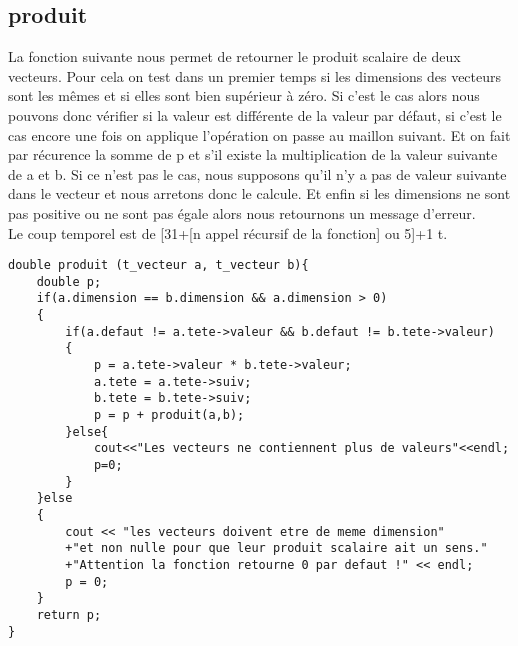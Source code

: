 \documentclass[a4paper,11pt,final]{article}
\begin{document}
\subsection{produit}
La fonction suivante nous permet de retourner le produit scalaire de deux vecteurs. Pour cela on test dans un premier temps si les dimensions des vecteurs sont les mêmes et si elles sont bien supérieur à zéro. Si c'est le cas alors nous pouvons donc vérifier si la valeur est différente de la valeur par défaut, si c'est le cas encore une fois on applique l'opération on passe au maillon suivant. Et on fait par récurence la somme de p et s'il existe la multiplication de la valeur suivante de a et b. Si ce n'est pas le cas, nous supposons qu'il n'y a pas de valeur suivante dans le vecteur et nous arretons donc le calcule. Et enfin si les dimensions ne sont pas positive ou ne sont pas égale alors nous retournons un message d'erreur. \\
Le coup temporel est de [31+[n appel récursif de la fonction] ou 5]+1 t.
\begin{verbatim}
double produit (t_vecteur a, t_vecteur b){
    double p;
    if(a.dimension == b.dimension && a.dimension > 0)
    {
        if(a.defaut != a.tete->valeur && b.defaut != b.tete->valeur)
        {
            p = a.tete->valeur * b.tete->valeur;
            a.tete = a.tete->suiv;
            b.tete = b.tete->suiv;
            p = p + produit(a,b);
        }else{
            cout<<"Les vecteurs ne contiennent plus de valeurs"<<endl;
            p=0;
        }
    }else
    {
        cout << "les vecteurs doivent etre de meme dimension"
        +"et non nulle pour que leur produit scalaire ait un sens."
        +"Attention la fonction retourne 0 par defaut !" << endl;
        p = 0;
    }
    return p;
}
\end{verbatim}
\end{document}
